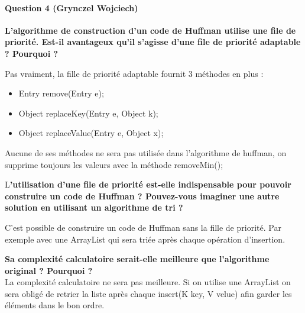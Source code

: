 \documentclass[a4paper]{article}
\begin{document}
\paragraph*{Question 4 (Grynczel Wojciech)}
\textbf{L’algorithme de construction d’un code de Huffman utilise une file de priorité. Est-il avantageux qu’il s’agisse d’une file de priorité adaptable ? Pourquoi ?}

Pas vraiment, la fille de priorité adaptable fournit 3 méthodes en plus :
\begin{itemize}
	\item Entry remove(Entry e);
	\item Object replaceKey(Entry e, Object k);
	\item Object replaceValue(Entry e, Object x);
\end{itemize}

Aucune de ses méthodes ne sera pas utilisée dans l'algorithme de huffman, on supprime toujours les valeurs avec la méthode removeMin(); 

L\textbf{’utilisation d’une file de priorité est-elle indispensable pour pouvoir construire un code de Huffman ? Pouvez-vous imaginer une autre solution en utilisant un algorithme de tri ? }

C’est possible de construire un code de Huffman sans la fille de priorité. Par exemple avec une ArrayList qui sera triée après chaque opération d’insertion.

\textbf{Sa complexité calculatoire serait-elle meilleure que l’algorithme original ? Pourquoi ?}\\
La complexité calculatoire ne sera pas meilleure. Si on utilise une ArrayList on sera obligé de retrier la liste après chaque insert(K key, V velue) afin garder les éléments dans le bon ordre.  
\end{document}
